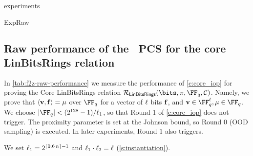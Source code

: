 \begin{lncsappendix}{experiments}
\begin{lncsmove}{ExpRaw}
\subsection{Raw performance of the \ftwoz \ PCS for the core LinBitsRings relation}

In \cref{tab:f2z-raw-performance} we measure the performance of \cref{c:core_iop} for proving the Core LinBitsRings relation $\LinBitsDual(\bits, \pi, \FF_q,\cC)$\iflncs\else\fi. Namely, we prove that $\langle \mathbf{v}, \mathbf{f} \rangle=\mu$ over $\FF_q$ for a vector of $\ell$ bits $\mathbf{f}$, and $\vv\in \FF_q^{\codedim}, \mu\in \FF_q$. We choose  $|\FF_q|  < (2^{128}-1)/\codedim_1$, so that Round 1 of \cref{c:core_iop} does not trigger. The proximity parameter is set at the Johnson bound, so Round 0 (OOD sampling) is executed.  In later experiments, Round 1 also triggers. 

 We set $\ell_1 = 2^{\lceil 0.6\, n\rceil -1}$ and $\ell_1 \cdot \ell_2 = \ell$ (\cref{s:instantiation}).




\end{lncsmove}
\end{lncsappendix}

